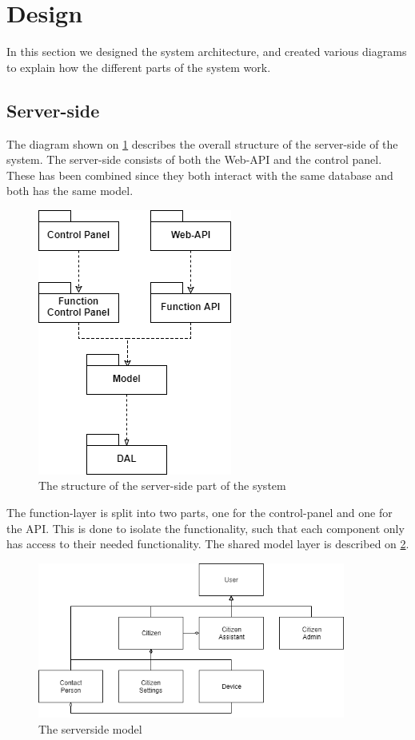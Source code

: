 \section{Design}
In this section we designed the system architecture, and created various diagrams to explain how the different parts of the system work.


\subsection{Server-side}
The diagram shown on \ref{fig:serversidestructure} describes the overall structure of the server-side of the system. The server-side consists of both the Web-API and the control panel. These has been combined since they both interact with the same database and both has the same model. 

\begin{figure}[H]
    \centering
    \includegraphics{Figures/serverSide.png}
    \caption{The structure of the server-side part of the system}
    \label{fig:serversidestructure}
\end{figure}

The function-layer is split into two parts, one for the control-panel and one for the API. This is done to isolate the functionality, such that each component only has access to their needed functionality. The shared model layer is described on \ref{fig:serversidemodel}.

\begin{figure}[H]
    \centering 
    \includegraphics[width=0.9\textwidth]{Figures/serverSidemodel.png}
    \caption{The serverside model}
    \label{fig:serversidemodel}
\end{figure}

